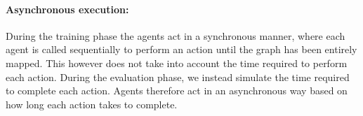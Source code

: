 \paragraph{Asynchronous execution:}

During the training phase the agents act in a synchronous manner, where
each agent is
called sequentially to perform an action until the graph has been entirely mapped.
This however does not take into account the time required to perform each action.
 During the
evaluation phase, we instead simulate the time required to complete  each action. Agents
therefore act in an asynchronous way based on how long each action takes to complete.
